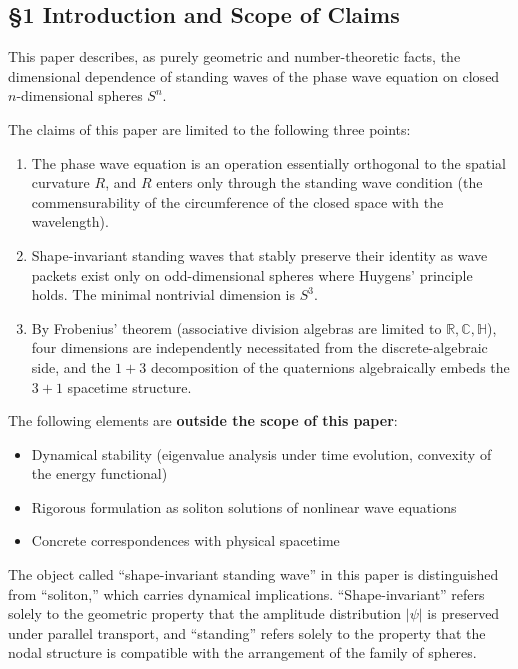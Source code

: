 \documentclass[
  a4paper,11pt]{article}
\providecommand{\tightlist}{%
  \setlength{\itemsep}{0pt}\setlength{\parskip}{0pt}}
\theoremstyle{definition}
\theoremstyle{remark}
\begin{document}
\subsection{§1 Introduction and Scope of
Claims}\label{introduction-and-scope-of-claims}

This paper describes, as purely geometric and number-theoretic facts,
the dimensional dependence of standing waves of the phase wave equation
on closed \(n\)-dimensional spheres \(S^n\).

The claims of this paper are limited to the following three points:

\begin{enumerate}
\def\labelenumi{\arabic{enumi}.}
\tightlist
\item
  The phase wave equation is an operation essentially orthogonal to the
  spatial curvature \(R\), and \(R\) enters only through the standing
  wave condition (the commensurability of the circumference of the
  closed space with the wavelength).
\item
  Shape-invariant standing waves that stably preserve their identity as
  wave packets exist only on odd-dimensional spheres where Huygens'
  principle holds. The minimal nontrivial dimension is \(S^3\).
\item
  By Frobenius' theorem (associative division algebras are limited to
  \(\mathbb{R}, \mathbb{C}, \mathbb{H}\)), four dimensions are
  independently necessitated from the discrete-algebraic side, and the
  \(1+3\) decomposition of the quaternions algebraically embeds the
  \(3+1\) spacetime structure.
\end{enumerate}

The following elements are \textbf{outside the scope of this paper}:

\begin{itemize}
\tightlist
\item
  Dynamical stability (eigenvalue analysis under time evolution,
  convexity of the energy functional)
\item
  Rigorous formulation as soliton solutions of nonlinear wave equations
\item
  Concrete correspondences with physical spacetime
\end{itemize}

The object called ``shape-invariant standing wave'' in this paper is
distinguished from ``soliton,'' which carries dynamical implications.
``Shape-invariant'' refers solely to the geometric property that the
amplitude distribution \(|\psi|\) is preserved under parallel transport,
and ``standing'' refers solely to the property that the nodal structure
is compatible with the arrangement of the family of spheres.
\end{document}
